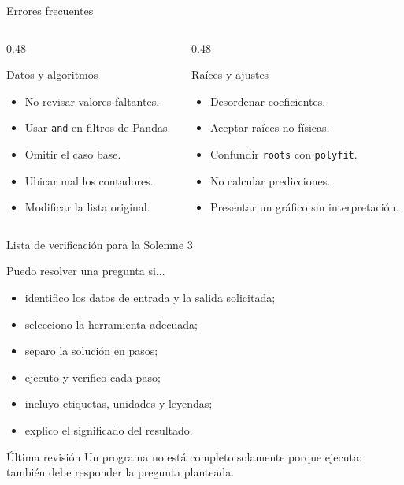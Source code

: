 \documentclass[10pt]{beamer}
\begin{document}
\begin{frame}{Errores frecuentes}
  \begin{columns}
    \begin{column}{0.48\textwidth}
      \begin{block}{Datos y algoritmos}
        \begin{itemize}
          \item No revisar valores faltantes.
          \item Usar \texttt{and} en filtros de Pandas.
          \item Omitir el caso base.
          \item Ubicar mal los contadores.
          \item Modificar la lista original.
        \end{itemize}
      \end{block}
    \end{column}
    \begin{column}{0.48\textwidth}
      \begin{block}{Raíces y ajustes}
        \begin{itemize}
          \item Desordenar coeficientes.
          \item Aceptar raíces no físicas.
          \item Confundir \texttt{roots} con \texttt{polyfit}.
          \item No calcular predicciones.
          \item Presentar un gráfico sin interpretación.
        \end{itemize}
      \end{block}
    \end{column}
  \end{columns}
\end{frame}

\begin{frame}{Lista de verificación para la Solemne 3}
  \begin{block}{Puedo resolver una pregunta si...}
    \begin{itemize}
      \item identifico los datos de entrada y la salida solicitada;
      \item selecciono la herramienta adecuada;
      \item separo la solución en pasos;
      \item ejecuto y verifico cada paso;
      \item incluyo etiquetas, unidades y leyendas;
      \item explico el significado del resultado.
    \end{itemize}
  \end{block}

  \begin{alertblock}{Última revisión}
    Un programa no está completo solamente porque ejecuta: también debe responder la pregunta planteada.
  \end{alertblock}
\end{frame}
\end{document}
